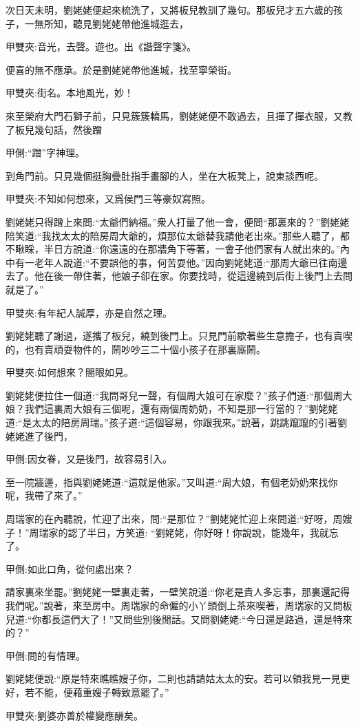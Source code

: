 \begin{parag}
    次日天未明，劉姥姥便起來梳洗了，又將板兒教訓了幾句。那板兒才五六歲的孩子，一無所知，聽見劉姥姥帶他進城逛去，\begin{note}甲雙夾:音光，去聲。遊也。出《諧聲字箋》。\end{note}便喜的無不應承。於是劉姥姥帶他進城，找至寧榮街。\begin{note}甲雙夾:街名。本地風光，妙！\end{note}來至榮府大門石獅子前，只見簇簇轎馬，劉姥姥便不敢過去，且撣了撣衣服，又教了板兒幾句話，然後蹭\begin{note}甲側:“蹭”字神理。\end{note}到角門前。只見幾個挺胸疊肚指手畫腳的人，坐在大板凳上，說東談西呢。\begin{note}甲雙夾:不知如何想來，又爲侯門三等豪奴寫照。\end{note}劉姥姥只得蹭上來問:“太爺們納福。”衆人打量了他一會，便問“那裏來的？”劉姥姥陪笑道:“我找太太的陪房周大爺的，煩那位太爺替我請他老出來。”那些人聽了，都不瞅睬，半日方說道:“你遠遠的在那牆角下等著，一會子他們家有人就出來的。”內中有一老年人說道:“不要誤他的事，何苦耍他。”因向劉姥姥道:“那周大爺已往南邊去了。他在後一帶住著，他娘子卻在家。你要找時，從這邊繞到后街上後門上去問就是了。”\begin{note}甲雙夾:有年紀人誠厚，亦是自然之理。\end{note}
\end{parag}


\begin{parag}
    劉姥姥聽了謝過，遂攜了板兒，繞到後門上。只見門前歇著些生意擔子，也有賣喫的，也有賣頑耍物件的，鬧吵吵三二十個小孩子在那裏廝鬧。\begin{note}甲雙夾:如何想來？閤眼如見。\end{note}劉姥姥便拉住一個道:“我問哥兒一聲，有個周大娘可在家麼？”孩子們道:“那個周大娘？我們這裏周大娘有三個呢，還有兩個周奶奶，不知是那一行當的？”劉姥姥道:“是太太的陪房周瑞。”孩子道:“這個容易，你跟我來。”說著，跳跳躥躥的引著劉姥姥進了後門，\begin{note}甲側:因女眷，又是後門，故容易引入。\end{note}至一院牆邊，指與劉姥姥道:“這就是他家。”又叫道:“周大娘，有個老奶奶來找你呢，我帶了來了。”
\end{parag}


\begin{parag}
    周瑞家的在內聽說，忙迎了出來，問:“是那位？”劉姥姥忙迎上來問道:“好呀，周嫂子！”周瑞家的認了半日，方笑道: “劉姥姥，你好呀！你說說，能幾年，我就忘了。\begin{note}甲側:如此口角，從何處出來？\end{note}請家裏來坐罷。”劉姥姥一壁裏走著，一壁笑說道:“你老是貴人多忘事，那裏還記得我們呢。”說著，來至房中。周瑞家的命僱的小丫頭倒上茶來喫著，周瑞家的又問板兒道:“你都長這們大了！”又問些別後閒話。又問劉姥姥:“今日還是路過，還是特來的？”\begin{note}甲側:問的有情理。\end{note}劉姥姥便說:“原是特來瞧瞧嫂子你，二則也請請姑太太的安。若可以領我見一見更好，若不能，便藉重嫂子轉致意罷了。”\begin{note}甲雙夾:劉婆亦善於權變應酬矣。\end{note}
\end{parag}


